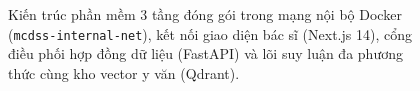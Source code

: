 \begin{figure}[htbp]
{\begin{tikzpicture}[node distance=1.2cm and 1.6cm]
\end{tikzpicture}%
}
\caption{Kiến trúc phần mềm 3 tầng đóng gói trong mạng nội bộ Docker (\texttt{mcdss-internal-net}), kết nối giao diện bác sĩ (Next.js 14), cổng điều phối hợp đồng dữ liệu (FastAPI) và lõi suy luận đa phương thức cùng kho vector y văn (Qdrant).}
\label{fig:system_architecture}
\end{figure}
